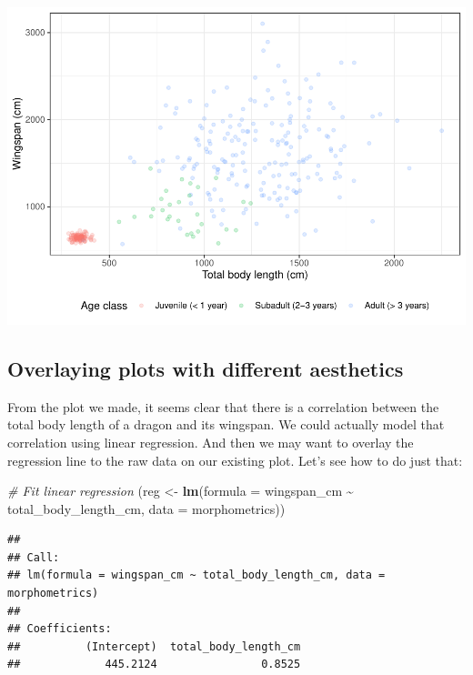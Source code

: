 \documentclass[
]{book}
\newenvironment{Shaded}{\begin{snugshade}}{\end{snugshade}}
\newcommand{\AttributeTok}[1]{\textcolor[rgb]{0.13,0.29,0.53}{#1}}
\newcommand{\CommentTok}[1]{\textcolor[rgb]{0.56,0.35,0.01}{\textit{#1}}}
\newcommand{\FunctionTok}[1]{\textcolor[rgb]{0.13,0.29,0.53}{\textbf{#1}}}
\newcommand{\NormalTok}[1]{#1}
\newcommand{\OtherTok}[1]{\textcolor[rgb]{0.56,0.35,0.01}{#1}}
\newcommand{\SpecialCharTok}[1]{\textcolor[rgb]{0.81,0.36,0.00}{\textbf{#1}}}
\begin{document}
\includegraphics{reproducible-science_files/figure-latex/gg16b-1.pdf}

\hypertarget{overlaying-plots-with-different-aesthetics}{%
\subsection{Overlaying plots with different aesthetics}\label{overlaying-plots-with-different-aesthetics}}

From the plot we made, it seems clear that there is a correlation between the
total body length of a dragon and its wingspan. We could actually model that
correlation using linear regression. And then we may want to overlay the
regression line to the raw data on our existing plot. Let's see how to do just
that:

\begin{Shaded}
\begin{Highlighting}[]
\CommentTok{\# Fit linear regression}
\NormalTok{(reg }\OtherTok{\textless{}{-}} \FunctionTok{lm}\NormalTok{(}\AttributeTok{formula =}\NormalTok{ wingspan\_cm }\SpecialCharTok{\textasciitilde{}}\NormalTok{ total\_body\_length\_cm, }
          \AttributeTok{data =}\NormalTok{ morphometrics))}
\end{Highlighting}
\end{Shaded}

\begin{verbatim}
## 
## Call:
## lm(formula = wingspan_cm ~ total_body_length_cm, data = morphometrics)
## 
## Coefficients:
##          (Intercept)  total_body_length_cm  
##             445.2124                0.8525
\end{verbatim}
\end{document}
